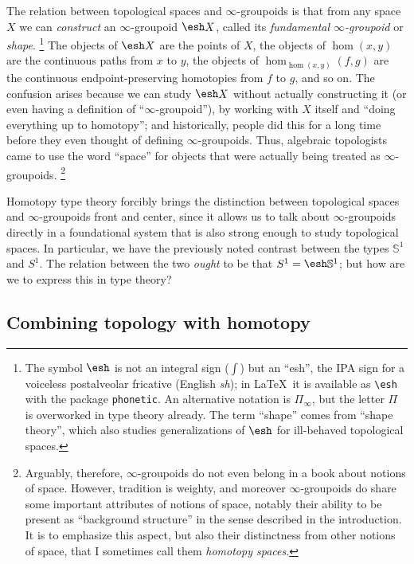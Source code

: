 \documentclass[10pt]{article}
\def\oo{\ensuremath{\infty}}
\def\hocirc{S^1}
\def\topcirc{\mathbb{S}^1}
\numberwithin{equation}{section}
\newcommand{\shape}{\ensuremath{\mathord{\raisebox{0.5pt}{\text{\rm\esh}}}}}
\begin{document}
The relation between topological spaces and \oo-groupoids is that from any space $X$ we can \emph{construct} an \oo-groupoid $\shape X$, called its \emph{fundamental \oo-groupoid} or \emph{shape}.%
\footnote{The symbol $\shape$ is not an integral sign ($\int$) but an ``esh'', the IPA sign for a voiceless postalveolar fricative (English \textit{sh}); in \LaTeX\ it is available as \verb|\esh| with the package \texttt{phonetic}.
  An alternative notation is $\Pi_\oo$, but the letter $\Pi$ is overworked in type theory already.
  The term ``shape'' comes from ``shape theory'', which also studies generalizations of $\shape$ for ill-behaved topological spaces.}
The objects of $\shape X$ are the points of $X$, the objects of $\hom(x,y)$ are the continuous paths from $x$ to $y$, the objects of $\hom_{\hom(x,y)}(f,g)$ are the continuous endpoint-preserving homotopies from $f$ to $g$, and so on.
The confusion arises because we can study $\shape X$ without actually constructing it (or even having a definition of ``\oo-groupoid''), by working with $X$ itself and ``doing everything up to homotopy''; and historically, people did this for a long time before they even thought of defining \oo-groupoids.
Thus, algebraic topologists came to use the word ``space'' for objects that were actually being treated as \oo-groupoids.%
\footnote{Arguably, therefore, \oo-groupoids do not even belong in a book about notions of space.
However, tradition is weighty, and moreover \oo-groupoids do share some important attributes of notions of space, notably their ability to be present as ``background structure'' in the sense described in the introduction.
It is to emphasize this aspect, but also their distinctness from other notions of space, that I sometimes call them \emph{homotopy spaces}.}

Homotopy type theory forcibly brings the distinction between topological spaces and \oo-groupoids front and center, since it allows us to talk about \oo-groupoids directly in a foundational system that is also strong enough to study topological spaces.
In particular, we have the previously noted contrast between the types $\topcirc$ and $\hocirc$.
The relation between the two \emph{ought} to be that $\hocirc = \shape \topcirc$; but how are we to express this in type theory?

\subsection{Combining topology with homotopy}
\label{sec:comb-topol-with}
\end{document}

